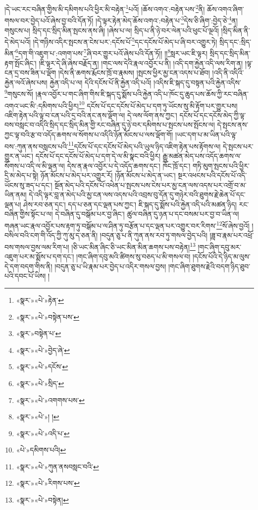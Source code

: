 །དེ་ཡང་རང་བཞིན་གྱིས་མི་དམིགས་པའི་ཕྱིར་མི་བརྟེན་\footnote{«སྣར་»«པེ་»རྟེན་}པའོ། །ཆོས་འགའ་:བརྟེན་པས་\footnote{«སྣར་»«པེ་»བསྟེན་པས་}ནི། ཆོས་འགའ་ཞིག་གསལ་བར་བྱེད་པའོ་ཞེས་བྱ་བའི་དོན་ཏོ། །དེ་ལྟར་རྟེན་མེད་ཆོས་འགའ་:བརྟེན་པ་\footnote{«སྣར་»བསྟེན་པ་}དེས་ཅི་ཞིག་:བྱེད་ཅེ་\footnote{«སྣར་»«པེ་»བྱེད་ཞེ་}ན། གསུངས་པ། སྲིད་དང་སྲིད་མིན་སྤངས་ནས་ཞི། །ཞེས་པ་ལ། སྲིད་པ་ནི་ཉེ་བར་ལེན་པའི་ཕུང་པོ་ལྔའོ། །སྲིད་མིན་ནི་དེ་མེད་པའོ། །དེ་གཉིས་འདིར་སྤངས་ན་ངེས་པར་:དངོས་པོ་\footnote{«སྣར་»«པེ་»དངོས་}དང་དངོས་པོ་མེད་པ་ཞི་བར་འགྱུར་ཏེ། སྲིད་དང་:སྲིད་མིན་\footnote{«སྣར་»«པེ་»སྲིད་}དག་གི་འཇུག་པ་:འགག་པས་\footnote{«སྣར་»«པེ་»འགགས་པས་}ཞི་བར་གྱུར་པའོ་ཞེས་པའི་དོན་ཏོ།། །།\footnote{«སྣར་»«པེ་»། །}སླར་ཡང་ཇི་ལྟར། སྲིད་དང་སྲིད་མིན་རྟག་སྤོང་ཞིང་། །ཇི་ལྟར་དེ་ཞི་ཞེས་བརྗོད་ན། །གང་ལས་དེའི་རྣལ་འབྱོར་པ་ནི། །འདི་དག་རྐྱེན་འདི་ལས་རིག་ན། །ལྟ་ངན་དྲ་བས་ཟིན་པ་ལྡོག །དེས་ནི་ཆགས་རྨོངས་ཁྲོ་བ་རྣམས། །སྤངས་ཕྱིར་མྱ་ངན་འདས་པ་ཐོབ། །འདི་ནི་འདིའི་རྐྱེན་ལའོ་ཞེས་པས། རྐྱེན་འདི་པ་ལ། དེའི་དངོས་པོ་ནི་རྐྱེན་འདི་པའོ། །འདིས་ཇི་སྐད་དུ་བསྟན་པའི་རྐྱེན་འདིས་\footnote{«སྣར་»«པེ་»འདི་པ་}གསུངས་སོ། །རྣལ་འབྱོར་པ་གང་ཞིག་གིས་ཇི་སྐད་དུ་སྨོས་པའི་རྐྱེན་འདི་པ་ཁོང་དུ་ཆུད་པས་ཆོས་ཀྱི་རང་བཞིན་འགའ་ཡང་མི་:དམིགས་པའི་ཕྱིར།\footnote{«པེ་»དམིགས་པའི།} དངོས་པོ་དང་དངོས་པོ་མེད་པ་དག་ཏུ་ཡོངས་སུ་མི་རྟོག་པར་གྱུར་པས། འཇིག་རྟེན་པའི་ལྟ་བ་ངན་པའི་དྲ་བའི་ནང་ནས་ལྡོག་ལ། དེ་ལས་ལོག་ནས་ཀྱང་། དངོས་པོ་དང་དངོས་མེད་ཀྱི་ལྟ་བས་བསླང་བ་འདིའི་སྲིད་དང་སྲིད་མིན་གྱི་རང་བཞིན་དུ་ཉེ་བར་དམིགས་པ་སྤངས་པས་སྤོངས་ལ། དེ་སྤངས་ནས་ཀྱང་ལྟ་བའི་རྩ་བ་འདོད་ཆགས་ལ་སོགས་པ་འདིའི་ཉོན་མོངས་པ་ལས་ལྡོག་གོ། །ཡང་དག་པ་མ་ཡིན་པའི་ལྟ་བས་:ཀུན་ནས་བསླངས་པའི་\footnote{«སྣར་»«པེ་»ཀུན་ནསབསླང་བའི་}དངོས་པོ་དང་དངོས་པོ་མེད་པའི་ཡུལ་ཉིད་འཇིག་རྟེན་པས་རྟོགས་ལ། དེ་སྤངས་པར་གྱུར་ན་ཡང་། དངོས་པོ་དང་དངོས་པོ་མེད་པ་དག་དེ་ལ་མི་སྣང་བའི་ཕྱིར། རྒྱུ་མཚན་མེད་པས་འདོད་ཆགས་ལ་སོགས་པ་འདི་ལ་མི་ལྡན་ལ། དེས་ན་རྣལ་འབྱོར་པ་དེ་འདོད་ཆགས་དང་། ཁོང་ཁྲོ་དང་། གཏི་མུག་སྤངས་པའི་ཕྱིར་དྲི་མ་མེད་པ་སྟེ། ཉོན་མོངས་པ་མེད་པར་འགྱུར་རོ། །ཉོན་མོངས་པ་མེད་ན་ཡང་། སྔར་འཕངས་པའི་དངོས་པོ་འདི་ཡོངས་སུ་ཟད་པ་དང་། སྔོན་མེད་པའི་དངོས་པོ་འཕེན་པ་སྤངས་པས་ངེས་པར་མྱ་ངན་ལས་འདས་པར་འགྲོ་བ་མ་ཡིན་ནམ། དེ་འདི་ལྟར་བླ་ན་མེད་པའི་མྱ་ངན་ལས་འདས་པའི་འབྲས་བུ་དོན་དུ་གཉེར་བའི་ཐུགས་རྗེ་ཆེན་པོ་དང་ལྡན་པ། ཤེས་རབ་ཅན་དང་། དད་པ་ཅན་དང་ལྡན་པས་ཀྱང་། ཇི་སྐད་དུ་སྨོས་པའི་རྐྱེན་འདི་པའི་མཚན་ཉིད། རང་བཞིན་གྱིས་སྟོང་པ་ལ། དེ་བཞིན་དུ་བསྒོམ་པར་བྱ་ཞིང་། ཚུལ་བཞིན་དུ་ཉན་པ་དང་བསམ་པར་བྱ་བ་ཡིན་ལ། གཞན་ཡང་རྣལ་འབྱོར་པས་རྟག་ཏུ་བསྒོམ་པ་ལ་ཤིན་ཏུ་བརྩོན་པ་དང་ལྡན་པར་འགྱུར་བར་རིགས་\footnote{«སྣར་»«པེ་»རིགས་པས་}སོ་ཞེས་བྱའོ། །བསིལ་བའི་ངག་གི་འོད་ཀྱི་ཀུ་མུ་ད་ཅན་ནི། །བདུན་ཅུ་པ་ནི་ཀུན་ནས་རབ་ཏུ་གསལ་བྱེད་པའི། །ཟླ་བ་རྣམ་པར་འཕྲོ་བས་གསལ་བྱས་ལམ་རིག་པ། །ཅི་ཡང་མིན་ཞིང་ཅི་ཡང་མིན་མིན་ཆགས་པས་བརྟེན།\footnote{«སྣར་»«པེ་»བསྟེན།} །གང་ཞིག་དབུ་མར་འཇུག་པར་མ་སྨོས་པ་དག་དང་། །གང་ཞིག་དབུ་མའི་ཚིགས་སུ་བཅད་པ་མི་གསལ་བ། །དངོས་པོའི་དེ་ཉིད་མ་ལུས་དེ་དག་བདག་གིས་ནི། །བདུན་ཅུ་པ་ཡི་རྣམ་པར་བྱེད་པ་འདིར་གསལ་བྱས། །གང་ཞིག་ཐུགས་རྗེའི་བདག་ཉིད་ཐུབ་པའི་དབང་པོ་ཡིས། །
